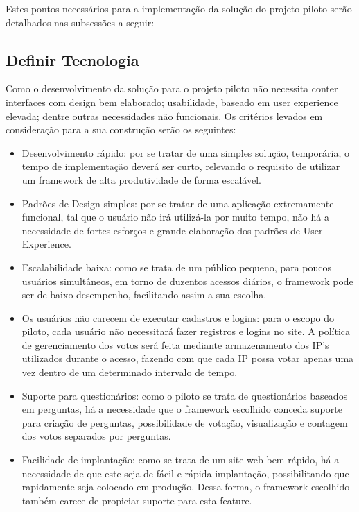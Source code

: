 Estes pontos necessários para a implementação da solução do projeto piloto serão detalhados 
nas subsessões a seguir:

\subsection{Definir Tecnologia}
\label{sub:definir_tecnologia}
Como o desenvolvimento da solução para o projeto piloto não necessita conter interfaces com design bem elaborado;
usabilidade, baseado em user experience elevada; dentre outras necessidades não funcionais. Os critérios levados em
consideração para a sua construção serão os seguintes:

\begin{itemize}
    \item Desenvolvimento rápido: por se tratar de uma simples solução, temporária, o tempo de implementação deverá
        ser curto, relevando o requisito de utilizar um framework de alta produtividade de forma escalável.
    \item Padrões de Design simples: por se tratar de uma aplicação extremamente funcional, tal que o usuário não irá
        utilizá-la por muito tempo, não há a necessidade de fortes esforços e grande elaboração dos padrões de
        User Experience.
    \item Escalabilidade baixa: como se trata de um público pequeno, para poucos usuários simultâneos, em torno de duzentos
        acessos diários, o framework pode ser de baixo desempenho, facilitando assim a sua escolha.
    \item Os usuários não carecem de executar cadastros e logins: para o escopo do piloto, cada usuário não necessitará
        fazer registros e logins no site. A política de gerenciamento dos votos será feita mediante armazenamento dos
        IP's utilizados durante o acesso, fazendo com que cada IP possa votar apenas uma vez dentro de um determinado
        intervalo de tempo.
    \item Suporte para questionários: como o piloto se trata de questionários baseados em perguntas, há a necessidade que o framework
        escolhido conceda suporte para criação de perguntas, possibilidade de votação, visualização e contagem dos votos
        separados por perguntas.
    \item Facilidade de implantação: como se trata de um site web bem rápido, há a necessidade de que este seja de fácil e rápida
        implantação, possibilitando que rapidamente seja colocado em produção. Dessa forma, o framework escolhido também carece
        de propiciar suporte para esta feature.
\end{itemize}

